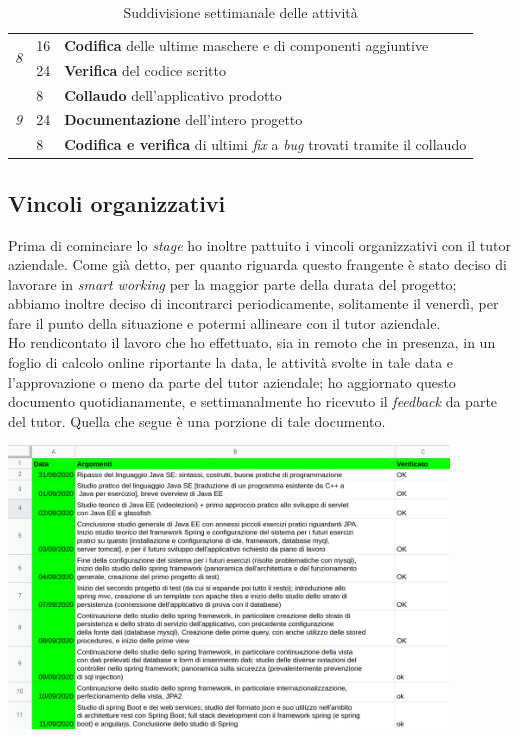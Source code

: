 \begin{table}[h]
\begin{tabularx}{\textwidth}{|l|l|X|}
  \multirow{2}{*}{\textit{8}} & 16           & \textbf{Codifica} delle ultime maschere e di componenti aggiuntive           \\ \cline{2-3}
                              & 24           & \textbf{Verifica} del codice scritto                  \\ \hline
  \multirow{3}{*}{\textit{9}} & 8            & \textbf{Collaudo} dell'applicativo prodotto                  \\ \cline{2-3}
                              & 24           & \textbf{Documentazione} dell'intero progetto            \\ \cline{2-3}
                              & 8            & \textbf{Codifica e verifica} di ultimi \textit{fix} a \textit{bug} trovati tramite il collaudo                \\ \hline
  \end{tabularx}
  \caption{Suddivisione settimanale delle attività}
\end{table}

\subsection{Vincoli organizzativi}

Prima di cominciare lo \textit{stage} ho inoltre pattuito i vincoli organizzativi con il tutor aziendale. Come già detto, per quanto riguarda questo frangente è stato deciso di lavorare in \textit{smart working} per la maggior parte della durata del progetto; abbiamo inoltre deciso di incontrarci periodicamente, solitamente il venerdì, per fare il punto della situazione e potermi allineare con il tutor aziendale. \\
Ho rendicontato il lavoro che ho effettuato, sia in remoto che in presenza, in un foglio di calcolo online riportante la data, le attività svolte in tale data e l'approvazione o meno da parte del tutor aziendale; ho aggiornato questo documento quotidianamente, e settimanalmente ho ricevuto il \textit{feedback} da parte del tutor. Quella che segue è una porzione di tale documento. \newpage

\begin{minipage}{\linewidth}
  \centering
    \includegraphics[height=7.5cm]{immagini/drive}
\end{minipage} \\

